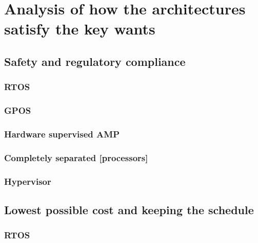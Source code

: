
\chapter{Analysis of how the architectures satisfy the key wants} %

\label{Chapter3} %


\newcommand{\keyword}[1]{\textbf{#1}}
\newcommand{\tabhead}[1]{\textbf{#1}}
\newcommand{\code}[1]{\texttt{#1}}
\newcommand{\file}[1]{\texttt{\bfseries#1}}
\newcommand{\option}[1]{\texttt{\itshape#1}}


\section{Safety and regulatory compliance}
\subsection{RTOS}
\subsection{GPOS}
\subsection{Hardware supervised AMP}
\subsection{Completely separated [processors]}
\subsection{Hypervisor}


\section{Lowest possible cost and keeping the schedule}
\subsection{RTOS}
